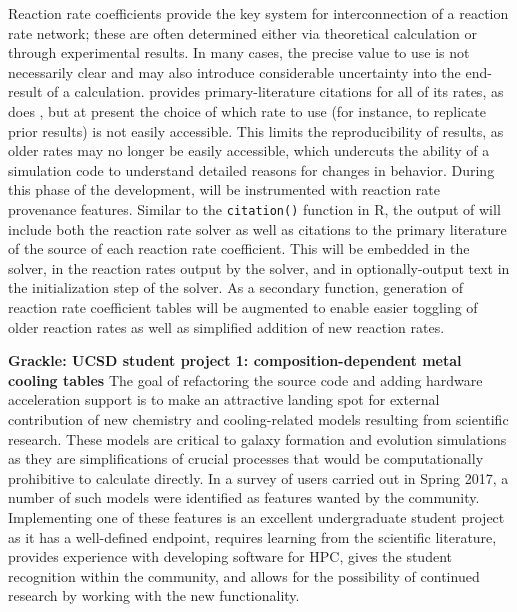 Reaction rate coefficients provide the key system for interconnection of a
reaction rate network; these are often determined either via theoretical
calculation or through experimental results.  In many cases, the precise value
to use is not necessarily clear \citep[][see, e.g.,]{2011ApJ...726...55T} and
may also introduce considerable uncertainty into the end-result of a
calculation.  \grackle{} provides primary-literature citations for all of its
rates, as does \dengo{}, but at present the choice of which rate to use (for
instance, to replicate prior results) is not easily accessible.  This limits
the reproducibility of results, as older rates may no longer be easily
accessible, which undercuts the ability of a simulation code to understand
detailed reasons for changes in behavior.  During this phase of the
development, \dengo{} will be instrumented with reaction rate provenance
features.  Similar to the \texttt{citation()} function in R, the output of
\dengo{} will include both the reaction rate solver as well as citations to the
primary literature of the source of each reaction rate coefficient.  This will
be embedded in the solver, in the reaction rates output by the solver, and in
optionally-output text in the initialization step of the solver.  As a
secondary function,  generation of reaction rate coefficient tables
will be augmented to enable easier toggling of older reaction rates as well as
simplified addition of new reaction rates.

\noindent \textbf{Grackle: UCSD student project 1:
  composition-dependent metal cooling tables} The goal of refactoring
the \grackle{} source code and adding hardware acceleration support is
to make \grackle{} an attractive landing spot for external
contribution of new chemistry and cooling-related models resulting
from scientific research.
These models are critical to galaxy formation and evolution
simulations as they are simplifications of crucial processes that
would be computationally prohibitive to calculate directly.  
In a survey of \grackle{} users carried out in Spring 2017, a number
of such models were identified as features wanted by the community.
Implementing one of these features is an excellent undergraduate
student project as it has a well-defined endpoint, requires learning
from the scientific literature, provides experience with developing
software for HPC, gives the student recognition within the community,
and allows for the possibility of continued research by working with
the new functionality.

